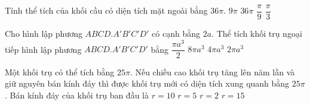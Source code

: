 \begin{ex}%
	Tính thể tích của khối cầu có diện tích mặt ngoài bằng $36\pi$. 
	\choice
	{$9\pi$}
	{\True $36\pi$}
	{$\dfrac{\pi}{9}$}
	{$\dfrac{\pi}{3}$}
\end{ex}

\begin{ex}%
	Cho hình lập phương $ABCD.A'B'C'D'$ có cạnh bằng $2a$. Thể tích khối trụ ngoại tiếp hình lập phương $ABCD.A'B'C'D'$ bằng
	\choice
	{$\dfrac{\pi a^3}{2}$}
	{$8\pi a^3$}
	{\True $4\pi a^3$}
	{$2\pi a^3$}
\end{ex}

\begin{ex}%
	Một khối trụ có thể tích bằng $25\pi$. Nếu chiều cao khối trụ tăng lên năm lần và giữ nguyên bán kính đáy thì được khối trụ mới có diện tích xung quanh bằng $25\pi$. Bán kính đáy của khối trụ ban đầu là
	\choice
	{$r=10$}
	{\True $r=5$}
	{$r=2$}
	{$r=15$}
\end{ex}

